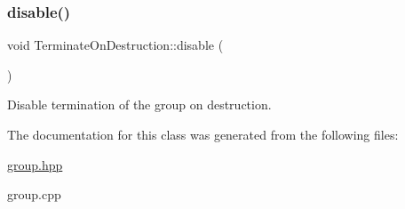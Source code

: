\subsubsection{\texorpdfstring{disable()}{disable()}}
{\footnotesize\ttfamily void Terminate\+On\+Destruction\+::disable (\begin{DoxyParamCaption}{ }\end{DoxyParamCaption})}



Disable termination of the group on destruction. 



The documentation for this class was generated from the following files\+:\begin{DoxyCompactItemize}
\item 
\mbox{\hyperlink{group_8hpp}{group.\+hpp}}\item 
group.\+cpp\end{DoxyCompactItemize}
